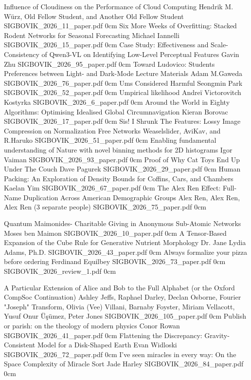 \addpaper
	{Influence of Cloudiness on the Performance of Cloud Computing}
	{Hendrik M. Würz, Old Fellow Student, and Another Old Fellow Student}
	{}
	{SIGBOVIK_2026_11_paper.pdf}
	{0cm}
	{}
\addpaper
	{Six More Weeks of Overfitting: Stacked Rodent Networks for Seasonal Forecasting}
	{Michael Iannelli}
	{}
	{SIGBOVIK_2026_15_paper.pdf}
	{0cm}
	{}
\addpaper
	{Case Study: Effectiveness and Scale-Consistency of Qwen3-VL on Identifying Low-Level Perceptual Features}
	{Gavin Zhu}
	{}
	{SIGBOVIK_2026_95_paper.pdf}
	{0cm}
	{}
\addpaper
	{Toward Ludovico: Students Preferences between Light- and Dark-Mode Lecture Materials}
	{Adam M.Gaweda}
	{}
	{SIGBOVIK_2026_76_paper.pdf}
	{0cm}
	{}
\addpaper
	{Ums Considered Harmful}
	{Seongmin Park}
	{}
	{SIGBOVIK_2026_52_paper.pdf}
	{0cm}
	{}
\addpaper
	{Umpirical likelihood}
	{Andreï Victorovitch Kostyrka}
	{}
	{SIGBOVIK_2026_6_paper.pdf}
	{0cm}
	{}
\addpaper
	{Around the World in Eighty Algorithms: Optimising Idealised Global Circumnavigation}
	{Kieran Borovac}
	{}
	{SIGBOVIK_2026_17_paper.pdf}
	{0cm}
	{}
\addpaper
	{Sis! I Shrunk The Features: Lossy Image Compression on Normalization Free Networks}
	{Weaselslider, AviKav, and R.Haruko}
	{}
	{SIGBOVIK_2026_51_paper.pdf}
	{0cm}
	{}
\addpaper
	{Enabling fundamental understanding of Nature with novel binning methods for 2D histograms}
	{Igor Vaiman}
	{}
	{SIGBOVIK_2026_93_paper.pdf}
	{0cm}
	{}
\addpaper
	{Proof of Why Cat Toys End Up Under The Couch}
	{Dave Pagurek}
	{}
	{SIGBOVIK_2026_29_paper.pdf}
	{0cm}
	{}
\addpaper
	{Human Packing: An Exploration of Density Bounds for Coffins, Cars, and Chambers}
	{Kaelan Yim}
	{}
	{SIGBOVIK_2026_67_paper.pdf}
	{0cm}
	{}
\addpaper
	{The Alex Ren Effect:  Full-Name Duplication Across American Demographic Groups}
	{Alex Ren, Alex Ren, Alex Ren (3 separate people)}
	{}
	{SIGBOVIK_2026_75_paper.pdf}
	{0cm}
	{}


\addpaper
	{Quantum Maimonides- Charitable Giving in Anonymous Sub-Atomic Networks}
	{Moses ben Maimon}
	{}
	{SIGBOVIK_2026_10_paper.pdf}
	{0cm}
	{}
\addpaper
	{A Tensor-Based Expansion of the Cube Rule for Generative Nutrient Morphology}
	{Dr. Jane Lydia Adams, Ph.D.}
	{}
	{SIGBOVIK_2026_43_paper.pdf}
	{0cm}
	{}
\addpaper
	{Always formalize your pizza before ordering}
	{Ferdinand Equilbey}
	{}
	{SIGBOVIK_2026_73_paper.pdf}
	{0cm}
	{}
\addreview
	{SIGBOVIK_2026_review_1.pdf}
	{0cm}

\addpaper
	{A Particular Extension of Alice and Bob to the Full Alphabet (or the Oxford CompSoc Continuation)}
	{Ashley Jeffs, Raphael Darley, Declan Osborne, Fourier "Joseph" Transform, Olivia (Vee) Villani, Barnaby Foyster, Miriam Vellacott, Yusuf Onur Üşümez, Peter Jones}
	{}
	{SIGBOVIK_2026_105_paper.pdf}
	{0cm}
	{}
\addpaper
	{Publish or parish: on the theology of modern physics}
	{Conor Rowan}
	{}
	{SIGBOVIK_2026_41_paper.pdf}
	{0cm}
	{}
\addpaper
	{Flattening the Discrepancy: Gravity-Consistent Model for a Disk-Shaped Earth}
	{Evan Widloski}
	{}
	{SIGBOVIK_2026_72_paper.pdf}
	{0cm}
	{}
\addpaper
	{I’ve seen miracles in every way: On the Space Complexity of Miracle Sort}
	{Jade Harley}
	{}
	{SIGBOVIK_2026_84_paper.pdf}
	{0cm}
	{}



